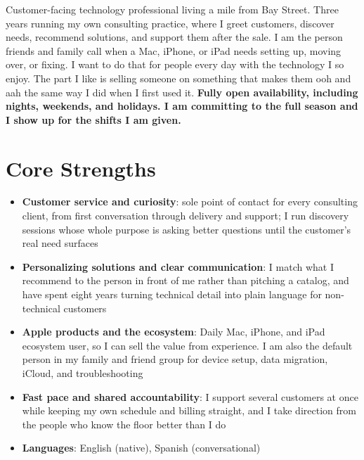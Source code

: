 \documentclass[11pt,a4paper,sans]{moderncv}
\begin{document}
\makecvtitle


\vspace{2pt}
\small{Customer-facing technology professional living a mile from Bay Street. Three years running my own consulting practice, where I greet customers, discover needs, recommend solutions, and support them after the sale. I am the person friends and family call when a Mac, iPhone, or iPad needs setting up, moving over, or fixing. I want to do that for people every day with the technology I so enjoy. The part I like is selling someone on something that makes them ooh and aah the same way I did when I first used it. \textbf{Fully open availability, including nights, weekends, and holidays. I am committing to the full season and I show up for the shifts I am given.}}


\section{Core Strengths}
\vspace{1pt}
\begin{itemize}

\item \textbf{Customer service and curiosity}: sole point of contact for every consulting client, from first conversation through delivery and support; I run discovery sessions whose whole purpose is asking better questions until the customer's real need surfaces

\item \textbf{Personalizing solutions and clear communication}: I match what I recommend to the person in front of me rather than pitching a catalog, and have spent eight years turning technical detail into plain language for non-technical customers

\item \textbf{Apple products and the ecosystem}: Daily Mac, iPhone, and iPad ecosystem user, so I can sell the value from experience. I am also the default person in my family and friend group for device setup, data migration, iCloud, and troubleshooting

\item \textbf{Fast pace and shared accountability}: I support several customers at once while keeping my own schedule and billing straight, and I take direction from the people who know the floor better than I do

\item \textbf{Languages}: English (native), Spanish (conversational)

\end{itemize}
\end{document}
